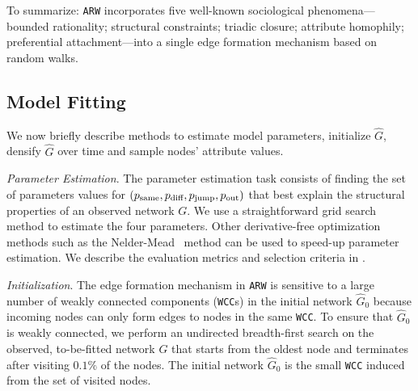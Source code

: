 To summarize: \texttt{ARW} incorporates five well-known sociological
phenomena--- bounded rationality; structural constraints; triadic closure;
attribute homophily; preferential attachment---into a single edge formation
mechanism based on random walks.




\subsection{Model Fitting}
\label{sub:Model Fitting}

We now briefly describe methods to estimate model parameters,
initialize $\hat{G}$, densify $\hat{G}$ over time and sample nodes' attribute values.

\textit{Parameter Estimation}.
The parameter estimation task consists of finding the set of parameters values
for $(p_{\scriptsize\mbox{same}}, p_{\scriptsize\mbox{diff}}, p_{\scriptsize\mbox{jump}}, p_{\scriptsize\mbox{out}})$ that best explain the structural properties of an
observed network $G$. We use a straightforward grid search method to estimate
the four parameters. Other derivative-free optimization methods such as the
Nelder-Mead~\cite{nelder1965simplex} method can be used to speed-up parameter
estimation. We describe the evaluation metrics and selection criteria in
.

\textit{Initialization}. The edge formation mechanism in \texttt{ARW} is
sensitive to a large number of weakly connected components (\texttt{WCC}s) in the
initial network $\hat{G}_0$ because incoming nodes can only form edges to nodes
in the same \texttt{WCC}. To ensure that $\hat{G}_0$ is weakly
connected, we perform an undirected breadth-first search on the observed,
to-be-fitted network $G$ that starts from the oldest node and terminates after
visiting $0.1\%$ of the nodes. The initial network $\hat{G}_0$ is the small \texttt{WCC}
induced from the set of visited nodes.


